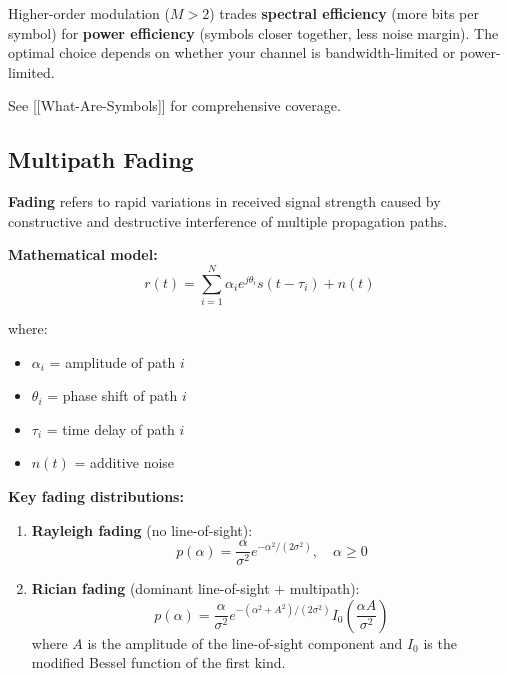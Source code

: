 \begin{keyconcept}
Higher-order modulation ($M > 2$) trades \textbf{spectral efficiency} (more bits per symbol) for \textbf{power efficiency} (symbols closer together, less noise margin). The optimal choice depends on whether your channel is bandwidth-limited or power-limited.
\end{keyconcept}

See {[}{[}What-Are-Symbols{]}{]} for comprehensive coverage.

\subsection{Multipath Fading}

\textbf{Fading} refers to rapid variations in received signal strength caused by constructive and destructive interference of multiple propagation paths.

\textbf{Mathematical model:}
\begin{equation}
r(t) = \sum_{i=1}^{N} \alpha_i e^{j\theta_i} s(t - \tau_i) + n(t)
\label{eq:multipath}
\end{equation}

where:
\begin{itemize}
\item $\alpha_i$ = amplitude of path $i$
\item $\theta_i$ = phase shift of path $i$
\item $\tau_i$ = time delay of path $i$
\item $n(t)$ = additive noise
\end{itemize}

\textbf{Key fading distributions:}

\begin{enumerate}
\item \textbf{Rayleigh fading} (no line-of-sight):
\begin{equation}
p(\alpha) = \frac{\alpha}{\sigma^2} e^{-\alpha^2/(2\sigma^2)}, \quad \alpha \geq 0
\label{eq:rayleigh}
\end{equation}

\item \textbf{Rician fading} (dominant line-of-sight + multipath):
\begin{equation}
p(\alpha) = \frac{\alpha}{\sigma^2} e^{-(\alpha^2 + A^2)/(2\sigma^2)} I_0\left(\frac{\alpha A}{\sigma^2}\right)
\label{eq:rician}
\end{equation}
where $A$ is the amplitude of the line-of-sight component and $I_0$ is the modified Bessel function of the first kind.
\end{enumerate}

